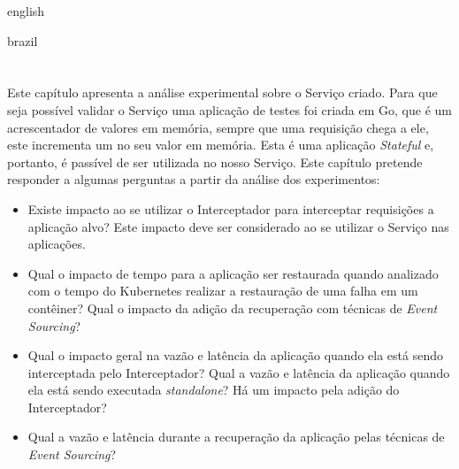

\begin{otherlanguage*}{english}


\begin{otherlanguage*}{brazil}

\chapter{} \label{cap:analise:experimental}

Este capítulo apresenta a análise experimental sobre o Serviço criado. Para que seja possível
validar o Serviço uma aplicação de testes foi criada em Go, que é um acrescentador de valores
em memória, sempre que uma requisição chega a ele, este incrementa um no seu valor em memória.
Esta é uma aplicação \textit{Stateful} e, portanto, é passível de ser utilizada no nosso Serviço.
Este capítulo pretende responder a algumas perguntas a partir da análise dos experimentos:

\begin{itemize}
	\item Existe impacto ao se utilizar o Interceptador para interceptar requisições a
	aplicação alvo? Este impacto deve ser considerado ao se utilizar o Serviço nas
	aplicações.
	\item Qual o impacto de tempo para a aplicação ser restaurada quando analizado com
	o tempo do Kubernetes realizar a restauração de uma falha em um contêiner? Qual o
	impacto da adição da recuperação com técnicas de \textit{Event Sourcing}?
	\item Qual o impacto geral na vazão e latência da aplicação quando ela está sendo
	interceptada pelo Interceptador? Qual a vazão e latência da aplicação quando ela
	está sendo executada \textit{standalone}? Há um impacto pela adição do Interceptador?
	\item Qual a vazão e latência durante a recuperação da aplicação pelas técnicas de
	\textit{Event Sourcing}?
\end{itemize}


\end{otherlanguage*}
\end{otherlanguage*}
